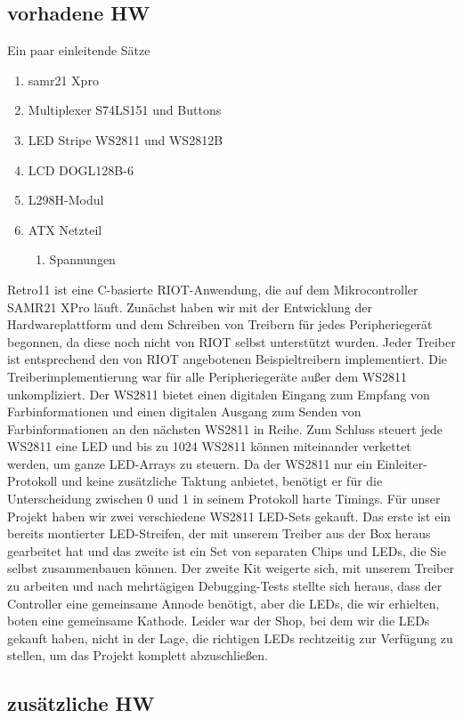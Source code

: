 \documentclass[a4paper]{article}
\begin{document}
\subsection{vorhadene HW}
Ein paar einleitende Sätze
\begin{enumerate}
	\item samr21 Xpro
	\item Multiplexer S74LS151 und Buttons
    \item LED Stripe WS2811 und WS2812B
    \item LCD DOGL128B-6
    \item L298H-Modul
	\item ATX Netzteil
	\begin{enumerate}
		\item Spannungen
	\end{enumerate}
\end{enumerate}
Retro11 ist eine C-basierte RIOT-Anwendung, die auf dem Mikrocontroller SAMR21 XPro läuft. Zunächst haben wir mit der Entwicklung der Hardwareplattform und dem Schreiben von Treibern für jedes Peripheriegerät begonnen, da diese noch nicht von RIOT selbst unterstützt wurden. Jeder Treiber ist entsprechend den von RIOT angebotenen Beispieltreibern implementiert. Die Treiberimplementierung war für alle Peripheriegeräte außer dem WS2811 unkompliziert. Der WS2811 bietet einen digitalen Eingang zum Empfang von Farbinformationen und einen digitalen Ausgang zum Senden von Farbinformationen an den nächsten WS2811 in Reihe. Zum Schluss steuert jede WS2811 eine LED und bis zu 1024 WS2811 können miteinander verkettet werden, um ganze LED-Arrays zu steuern. Da der WS2811 nur ein Einleiter-Protokoll und keine zusätzliche Taktung anbietet, benötigt er für die Unterscheidung zwischen 0 und 1 in seinem Protokoll harte Timings. Für unser Projekt haben wir zwei verschiedene WS2811 LED-Sets gekauft. Das erste ist ein bereits montierter LED-Streifen, der mit unserem Treiber aus der Box heraus gearbeitet hat und das zweite ist ein Set von separaten Chips und LEDs, die Sie selbst zusammenbauen können. Der zweite Kit weigerte sich, mit unserem Treiber zu arbeiten und nach mehrtägigen Debugging-Tests stellte sich heraus, dass der Controller eine gemeinsame Annode benötigt, aber die LEDs, die wir erhielten, boten eine gemeinsame Kathode. Leider war der Shop, bei dem wir die LEDs gekauft haben, nicht in der Lage, die richtigen LEDs rechtzeitig zur Verfügung zu stellen, um das Projekt komplett abzuschließen.
\subsection{zusätzliche HW}
\end{document}
